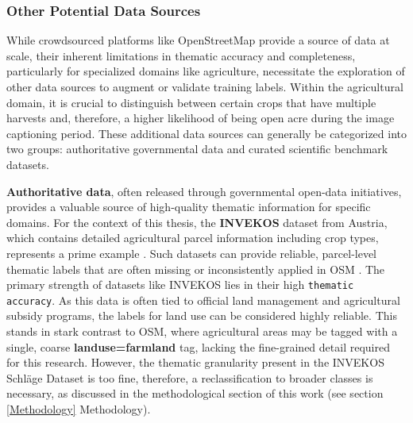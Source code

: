 \documentclass{report}
\begin{document}
\subsubsection{Other Potential Data Sources}
While crowdsourced platforms like OpenStreetMap provide a source of data at scale, their inherent limitations in thematic accuracy and completeness, particularly for specialized domains like agriculture, necessitate the exploration of other data sources to augment or validate training labels. Within the agricultural domain, it is crucial to distinguish between certain crops that have multiple harvests and, therefore, a higher likelihood of being open acre during the image captioning period. These additional data sources can generally be categorized into two groups: authoritative governmental data and curated scientific benchmark datasets.
\par
\textbf{Authoritative data}, often released through governmental open-data initiatives, provides a valuable source of high-quality thematic information for specific domains. For the context of this thesis, the \textbf{INVEKOS} dataset from Austria, which contains detailed agricultural parcel information including crop types, represents a prime example \parencites[]{AgrarmarktAustriaINVEKOSSchlageOsterreich2024}. Such datasets can provide reliable, parcel-level thematic labels that are often missing or inconsistently applied in OSM \parencites[p.~5]{UsmaniEtAlRemoteSensingDeepLearningUnderstandNoisyOpenStreetMap2023}. The primary strength of datasets like INVEKOS lies in their high \texttt{thematic accuracy}. As this data is often tied to official land management and agricultural subsidy programs, the labels for land use can be considered highly reliable. This stands in stark contrast to OSM, where agricultural areas may be tagged with a single, coarse \textbf{landuse=farmland} tag, lacking the fine-grained detail required for this research. However, the thematic granularity present in the INVEKOS Schläge Dataset is too fine, therefore, a reclassification to broader classes is necessary, as discussed in the methodological section of this work (see section \ref{Methodology} Methodology). 
\end{document}
